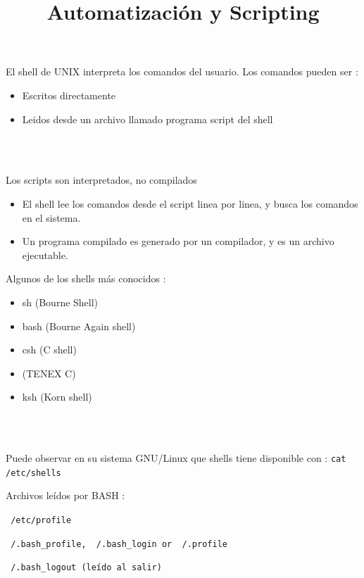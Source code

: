 \documentclass{beamer}
\title{Automatización y Scripting}
\begin{document}
\begin{frame}
  \titlepage
\end{frame}





\begin{frame}{}
El shell de UNIX interpreta los comandos del usuario. Los comandos pueden ser :
\begin{itemize}
\item Escritos directamente 
\item Leidos desde un archivo llamado programa script del shell 
\end{itemize}
\\ \

Los scripts son interpretados, no compilados
\begin{itemize}
\item El shell lee los comandos desde el script linea por linea, y busca los comandos en el sistema.
\item Un programa compilado es generado por un compilador, y es un archivo ejecutable.
\end{itemize}

\end{frame}


\begin{frame}{}
Algunos de los shells más conocidos : 
\begin{itemize}
\item sh (Bourne Shell)
\item bash (Bourne Again shell)
\item csh (C shell)
\item (TENEX C)
\item ksh (Korn shell)
\end{itemize}
\\ \

Puede observar en su sistema GNU/Linux que shells tiene disponible con : \texttt{cat /etc/shells}


\end{frame}


\begin{frame}{}
Archivos leídos por BASH : 

\texttt{ /etc/profile}

\texttt{~/.bash\_profile, ~/.bash\_login or ~/.profile }

\texttt{~/.bash\_logout (leído al salir) }

\end{frame}
\end{document}
